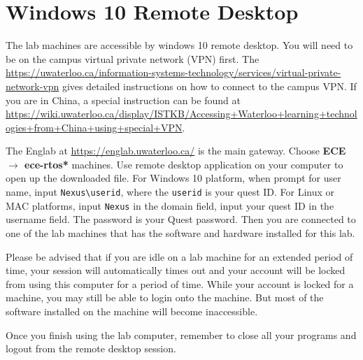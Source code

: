 \chapter{Windows 10 Remote Desktop}
\label{ch_rdp}

The lab machines are accessible by windows 10 remote desktop. You will need to be on the campus virtual private network (VPN) first. The \url{https://uwaterloo.ca/information-systems-technology/services/virtual-private-network-vpn} gives detailed instructions on how to connect to the campus VPN. If you are in China, a special instruction can be found at \url{https://wiki.uwaterloo.ca/display/ISTKB/Accessing+Waterloo+learning+technologies+from+China+using+special+VPN}.

The Englab at \url{https://englab.uwaterloo.ca/} is the main gateway. Choose {\bf ECE $\rightarrow$ ece-rtos*} machines. Use remote desktop application on your computer to open up the downloaded file. For Windows 10 platform, when prompt for user name, input \verb+Nexus\userid+, where the \verb+userid+ is your quest ID. For Linux or MAC platforms, input \verb+Nexus+ in the domain field, input your quest ID in the username field. The password is your Quest password. Then you are connected to one of the lab machines that has the software and hardware installed for this lab.

Please be advised that if you are idle on a lab machine for an extended period of time, your session will automatically times out and your account will be locked from using this computer for a period of time. While your account is locked for a machine, you may still be able to login onto the machine. But most of the software installed on the machine will become inaccessible. 

Once you finish using the lab computer, remember to close all your programs and logout from the remote desktop session.

